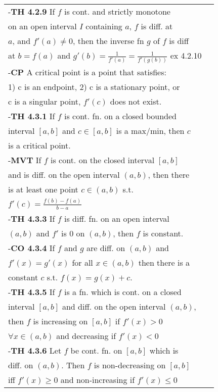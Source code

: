 \documentclass[10 pt,landscape]{article}
\begin{document}
\begin{multicols}{4}
\begin{tabular}{@{}ll@{}}
\end{tabular} 

\begin{tabular}{@{}ll@{}}

-\textbf{TH 4.2.9} If $f$ is cont. and strictly monotone\\ on an open interval $I$ containing $a$, $f$ is diff. at\\ $a$, and $f'(a) \neq 0$, then the inverse fn $g$ of $f$ is diff\\ at $b=f(a)$ and $g'(b)=\frac{1}{f'(a)}=\frac{1}{f'(g(b))}$ ex 4.2.10\\

-\textbf{CP} A critical point is a point that satisfies:\\
	
1) c is an endpoint, 2) c is a stationary point, or\\ c is a singular point, $f'(c)$ does not exist.\\
-\textbf{TH 4.3.1} If $f$ is cont. fn. on a closed bounded \\ interval $[a,b]$ and $c \in [a,b]$ is a max/min, then $c$ \\ is a critical point.\\
-\textbf{MVT} If $f$ is cont. on the closed interval $[a,b]$\\ and is diff. on the open interval $(a,b)$, then there \\is at least one point $c \in (a,b)$ s.t.\\ $f'(c)=\frac{f(b)-f(a)}{b-a}$\\
-\textbf{TH 4.3.3} If $f$ is diff. fn. on an open interval\\ $(a,b)$ and $f'$ is 0 on $(a,b)$, then $f$ is constant.\\
-\textbf{CO 4.3.4} If $f$ and $g$ are diff. on $(a,b)$ and \\ $f'(x)=g'(x)$ for all $x \in (a,b)$ then there is a \\ constant $c$ s.t. $f(x)=g(x)+c$.\\
-\textbf{TH 4.3.5} If $f$ is a fn. which is cont. on a closed\\
interval $[a,b]$ and diff. on the open interval $(a,b)$,\\ then $f$ is increasing on $[a,b]$ if $f'(x)>0 $\\ $\forall x \in (a,b)$ and decreasing if $f'(x)<0$\\
-\textbf{TH 4.3.6} Let $f$ be cont. fn. on $[a,b]$ which is \\
diff. on $(a,b)$. Then $f$ is non-decreasing on $[a,b]$ \\iff $f'(x)\geq 0$ and non-increasing if $f'(x)\leq 0$\\

\end{tabular}
\end{multicols}
\end{document}
